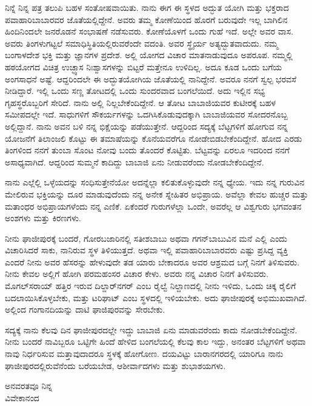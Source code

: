 ನಿನ್ನೆ ನಿನ್ನ ಪತ್ರ ತಲುಪಿ ಬಹಳ ಸಂತೋಷವಾಯಿತು. ನಾನು ಈಗ ಈ ಸ್ಥಳದ ಅದ್ಭುತ ಯೋಗಿ ಮತ್ತು ಭಕ್ತರಾದ ಪವಾಹಾರಿಬಾಬಾರವರ ಜೊತೆಯಲ್ಲಿದ್ದೇನೆ. ಅವರು ತಮ್ಮ ಕೋಣೆಯಿಂದ ಹೊರಗೆ ಬರುವುದೇ ಇಲ್ಲ \enginline{-} ಬಾಗಿಲಿನ ಹಿಂದಿನಿಂದಲೇ ಜನರೊಡನೆ ಸಂಭಾಷಣೆ ನಡೆಸುವರು. ಕೋಣೆಯೊಳಗೆ ಒಂದು ಗುಹೆ ಇದೆ. ಅಲ್ಲೇ ಅವರ ವಾಸ. ಅವರು ತಿಂಗಳುಗಟ್ಟಲೆ ಸಮಾಧಿಸ್ಥಿತಿಯಲ್ಲಿರುವರೆಂದೇ ವದಂತಿ. ಅವರ ಸ್ಥೈರ್ಯ ಅತ್ಯದ್ಭುತವಾದುದು. ನಮ್ಮ ಬಂಗಾಳದೇಶ ಭಕ್ತಿ ಮತ್ತು ಜ್ಞಾನಗಳ ಪ್ರದೇಶ. ಅಲ್ಲಿ ಯೋಗದ ವಿಚಾರ ಮಾತನಾಡುವುದೂ ಅಪರೂಪ. ನಮ್ಮಲ್ಲಿ ಹಠಯೋಗದ ವಿಚಿತ್ರ ಉಚ್ಛ್ವಾಸ ನಿಃಶ್ವಾಸಗಳನ್ನು ಬಿಟ್ಟರೆ ಮತ್ತೇನೂ ಉಳಿದಿಲ್ಲ. ಅದೂ ಕೂಡ ಒಂದು ಬಗೆಯ ಅಂಗಸಾಧನೆ ಅಷ್ಟೆ. ಆದ್ದರಿಂದಲೇ ಈ ಅದ್ಭುತಯೋಗಿಯ ಜೊತೆಯಲ್ಲಿ ನಾನಿದ್ದೇನೆ. ಅವರೂ ನನಗೆ ಸ್ವಲ್ಪ ಭರವಸೆ ನೀಡಿದ್ದಾರೆ. ಇಲ್ಲಿ ಒಂದು ಸಣ್ಣ ತೋಟದಲ್ಲಿ ಒಂದು ಸುಂದರವಾದ ಬಂಗಲೆಯಿದೆ. ಅದು ಇಲ್ಲಿನ ಸಭ್ಯ ಗೃಹಸ್ಥರೊಬ್ಬರಿಗೆ ಸೇರಿದೆ. ನಾನು ಅಲ್ಲಿ ನಿಲ್ಲಬೇಕೆಂದಿದ್ದೇನೆ. ಆ ತೋಟ ಬಾಬಾಜಿಯವರ ಕುಟೀರಕ್ಕೆ ಬಹಳ ಸಮೀಪದಲ್ಲೇ ಇದೆ. ಸಾಧುಗಳಿಗೆ ಸೌಕರ್ಯಗಳನ್ನು ಒದಗಿಸಿಕೊಡುವುದಕ್ಕಾಗಿ ಬಾಬಾಜಿಯವರ ಸೋದರನೊಬ್ಬ ಅಲ್ಲಿದ್ದಾನೆ. ನಾನು ಅವನ ಬಳಿ ನನ್ನ ಭಿಕ್ಷೆಯನ್ನು ಪಡೆಯುತ್ತೇನೆ. ಆದ್ದರಿಂದ ಸದ್ಯಕ್ಕೆ ಬೆಟ್ಟಗಳಿಗೆ ಹೋಗುವ ನನ್ನ ಯೋಜನೆಗೆ ತಿಲಾಂಜಲಿ ಕೊಟ್ಟು ಈ ತಮಾಷೆಯನ್ನು ಕೊನೆಯವರೆಗೂ ನೋಡೇಬಿಡಬೇಕೆಂದಿದ್ದೇನೆ. ಹೋದ ಎರಡು ತಿಂಗಳಿಂದ ನನಗೆ ತುಂಬಾ ಸೊಂಟ ನೋವು ಬಂದು ತೊಂದರೆ ಕೊಟ್ಟಿತು. ಬೆಟ್ಟವನ್ನು ಏರಲೂ ಇದರಿಂದ ನನಗೆ ಅಸಾಧ್ಯವಾಗಿದೆ. ಆದ್ದರಿಂದ ಸುಮ್ಮನೆ ಕಾದಿದ್ದು ಬಾಬಾಜಿ ಏನು ನೀಡುವರೆಂದು ನೋಡಬೇಕೆಂದಿದ್ದೇನೆ.

ನಾನು ಎಲ್ಲೆಲ್ಲಿ ಒಳ್ಳೆಯದನ್ನು ಸಂಧಿಸುತ್ತೇನೆಯೋ ಅದನ್ನೆಲ್ಲಾ ಕಲಿತುಕೊಳ್ಳುವುದೇ ನನ್ನ ಧ್ಯೇಯ. ಇದು ನನ್ನ ಗುರುವಿನ ಮೇಲಿರುವ ಭಕ್ತಿಯನ್ನು ದೂರ ಮಾಡುವುದೆಂದು ನನ್ನ ಅನೇಕ ಸ್ನೇಹಿತರ ಅಭಿಪ್ರಾಯ. ಅವೆಲ್ಲಾ ಕೇವಲ ಹುಚ್ಚರ ಮತ್ತು ಮತಾಂಧರ ಅಭಿಪ್ರಾಯಗಳೆಂದು ನನ್ನ ಎಣಿಕೆ. ಏಕೆಂದರೆ ಗುರುಗಳೆಲ್ಲಾ ಒಂದೇ, ಅವರೆಲ್ಲ ಆ ವಿಶ್ವಗುರು ಭಗವಂತನ ಅಂಶಗಳು ಮತ್ತು ಕಿರಣಗಳು.

ನೀನು ಘಾಜೀಪುರಕ್ಕೆ ಬಂದರೆ, ಗೋರಬಜಾರಿನಲ್ಲಿ ಸತೀಶಬಾಬು ಅಥವಾ ಗಗನ್‌ಬಾಬುವಿನ ಮನೆ ಎಲ್ಲಿ ಎಂದು ವಿಚಾರಿಸಿದರೆ ಸಾಕು, ನಾನಿರುವ ಸ್ಥಳ ತಿಳಿಯುತ್ತದೆ. ಅಥವಾ ಇಲ್ಲಿ ಪವಾಹಾರಿಬಾಬಾರವರು ಎಷ್ಟು ಪ್ರಸಿದ್ದ ವ್ಯಕ್ತಿ ಎಂದರೆ ನೀನು ಅವರ ಹೆಸರನ್ನು ಹೇಳುವುದೇ ತಡ ಯಾರು ಬೇಕಾದರೂ ಅವರ ಆಶ್ರಮದ ಬಗ್ಗೆ ನಿನಗೆ ತಿಳಿಸುವರು. ನೀನು ಕೇವಲ ಅಲ್ಲಿಗೆ ಹೋಗಿ ಪರಮಹಂಸರ ವಿಚಾರ ಕೇಳು. ಅವರು ನನ್ನ ವಿಚಾರ ನಿನಗೆ ತಿಳಿಸುವರು. ಮೊಗಲ್‌ಸರಾಯ್ ಹತ್ತಿರ ಇರುವ ದಿಲ್ದಾರ್‌ನಗರ್ ಎಂಬ ರೈಲ್ವೆ ನಿಲ್ದಾಣದಲ್ಲಿ ನೀನು ಇಳಿದು, ಒಂದು ಚಿಕ್ಕ ರೈಲಿಗೆ ಬದಲಾಯಿಸಿಕೊಳ್ಳಬೇಕು, ಮತ್ತು ಟರಿಘಾಟ್ ಎಂಬ ಸ್ಥಳದಲ್ಲಿ ಇಳಿಯಬೇಕು. ಅದು ಘಾಜೀಪುರಕ್ಕೆ ಅಭಿಮುಖವಾಗಿದೆ. ಅಲ್ಲಿಂದ ಗಂಗಾನದಿಯನ್ನು ದಾಟಿ ಘಾಜಿಪುರವನ್ನು ಸೇರಬೇಕು.

ಸದ್ಯಕ್ಕೆ ನಾನು ಕೆಲವು ದಿನ ಘಾಜೀಪುರದಲ್ಲೇ ಇದ್ದು ಬಾಬಾಜಿ ಏನು ಮಾಡುವರೆಂದು ಕಾದು ನೋಡಬೇಕೆಂದಿದ್ದೇನೆ. ನೀನು ಬಂದರೆ ನಾವಿಬ್ಬರೂ ಒಟ್ಟಿಗೇ ಹಿಂದೆ ಹೇಳಿದ ಬಂಗಲೆಯಲ್ಲಿ ಕೆಲವು ಕಾಲ ಇದ್ದು, ಅನಂತರ ಬೆಟ್ಟಗಳಿಗೆ ಅಥವಾ ನಾವು ನಿರ್ಧರಿಸುವ ಮತ್ತಾವುದಾದರೂ ಸ್ಥಳಕ್ಕೆ ಹೋಗೋಣ. ದಯವಿಟ್ಟು ಬಾರಾನಗರದಲ್ಲಿ ಯಾರಿಗೂ ನಾನು ಘಾಜೀಪುರದಲ್ಲಿರುವೆನೆಂದು ಬರೆಯಬೇಡ, ಆಶೀರ್ವಾದಗಳು ಮತ್ತು ಶುಭಾಶಯಗಳು.

{\flushright
ಅನವರತವೂ ನಿನ್ನ\\ವಿವೇಕಾನಂದ\par}

